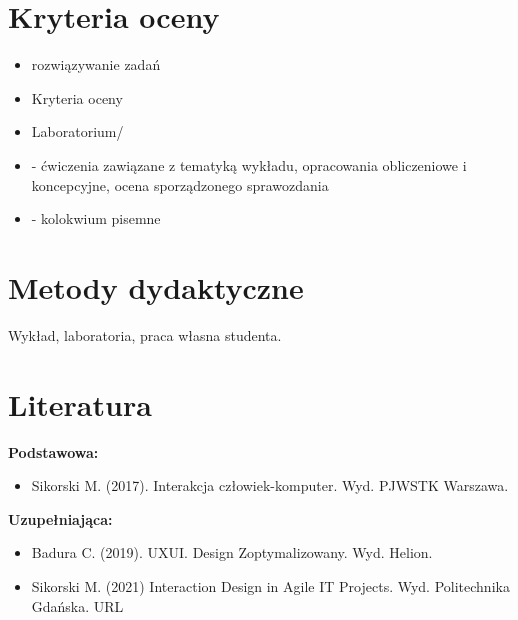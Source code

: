 \documentclass[12pt, a4paper]{article}
\begin{document}
\section{Kryteria oceny}

\begin{itemize}
  \item rozwiązywanie zadań
  \item Kryteria oceny
  \item Laboratorium/
  \item - ćwiczenia zawiązane z tematyką wykładu, opracowania obliczeniowe i koncepcyjne, ocena sporządzonego sprawozdania
  \item -  kolokwium pisemne
\end{itemize}

\section{Metody dydaktyczne}

Wykład, laboratoria, praca własna studenta.

\section{Literatura}

\textbf{Podstawowa:}
\begin{itemize}
  \item Sikorski M. (2017). Interakcja człowiek-komputer. Wyd. PJWSTK Warszawa.
\end{itemize}

\textbf{Uzupełniająca:}
\begin{itemize}
  \item Badura C. (2019). UXUI. Design Zoptymalizowany. Wyd. Helion.
  \item Sikorski  M. (2021) Interaction Design in Agile IT Projects. Wyd. Politechnika Gdańska.  URL
\end{itemize}
\end{document}
